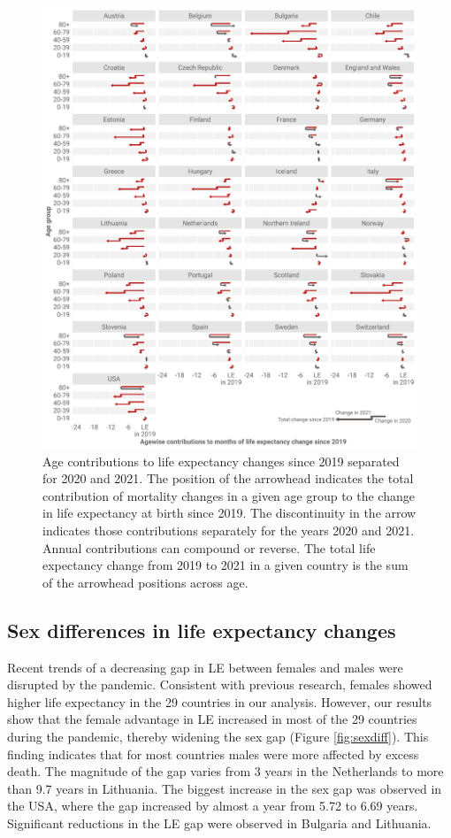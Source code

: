 \documentclass[12pt]{article}
\begin{document}
\begin{figure}[ht!]
    \centering
    \includegraphics{51-arriagaT.pdf}
    \caption{Age contributions to life expectancy changes since 2019 separated for 2020 and 2021. The position of the arrowhead indicates the total contribution of mortality changes in a given age group to the change in life expectancy at birth since 2019. The discontinuity in the arrow indicates those contributions separately for the years 2020 and 2021. Annual contributions can compound or reverse. The total life expectancy change from 2019 to 2021 in a given country is the sum of the arrowhead positions across age.}
    \label{fig:arriaga}
\end{figure}

\subsection*{Sex differences in life expectancy changes}

Recent trends of a decreasing gap in LE between females and males\citealp{Zarulli2021} were disrupted by the pandemic. Consistent with previous research, females showed higher life expectancy in the 29 countries in our analysis. However, our results show that the female advantage in LE increased in most of the 29 countries during the pandemic, thereby widening the sex gap (Figure \ref{fig:sexdiff}). This finding indicates that for most countries males were more affected by excess death. The magnitude of the gap varies from 3 years in the Netherlands to more than 9.7 years in Lithuania. The biggest increase in the sex gap was observed in the USA, where the gap increased by almost a year from 5.72 to 6.69 years. Significant reductions in the LE gap were observed in Bulgaria and Lithuania.
\end{document}
